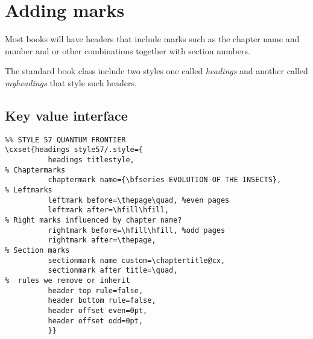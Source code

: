 \makeatletter
{}
\makeatother

   
\pagestyle{samplepage}


\section{Adding marks}

Most books will have headers that include marks such as the chapter name and number and or other combinations together with section numbers.

The standard book class include two styles one called \textit{headings} and another called \textit{myheadings} that style such headers.




\subsection{Key value interface}
\makeatletter
{}

\makeatother






\begin{tcolorbox}
\begin{lstlisting}
%% STYLE 57 QUANTUM FRONTIER
\cxset{headings style57/.style={
          headings titlestyle,
% Chaptermarks
          chaptermark name={\bfseries EVOLUTION OF THE INSECTS},
% Leftmarks
          leftmark before=\thepage\quad, %even pages
          leftmark after=\hfill\hfill,
% Right marks influenced by chapter name?
          rightmark before=\hfill\hfill, %odd pages
          rightmark after=\thepage,
% Section marks
          sectionmark name custom=\chaptertitle@cx,
          sectionmark after title=\quad,
%  rules we remove or inherit
          header top rule=false,
          header bottom rule=false,
          header offset even=0pt,
          header offset odd=0pt,
          }}
\end{lstlisting}
\end{tcolorbox}



